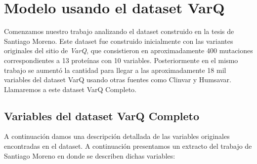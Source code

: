 \section{Modelo usando el dataset VarQ}

Comenzamos nuestro trabajo analizando el dataset construido en la tesis de Santiago Moreno. Este dataset fue construido inicialmente con las variantes originales del sitio de \textit{VarQ}, que consistieron en aproximadamente 400 mutaciones correspondientes a 13 proteínas con 10 variables. Posteriormente en el mismo trabajo se aumentó la cantidad para llegar a las aproximadamente 18 mil variables del dataset VarQ usando otras fuentes como Clinvar y Humsavar. Llamaremos a este dataset VarQ Completo. 

\subsection{Variables del dataset VarQ Completo}

A continuación damos una descripción detallada de las variables originales encontradas en el dataset. A continuación presentamos un extracto del trabajo de Santiago Moreno en donde se describen dichas variables: 


